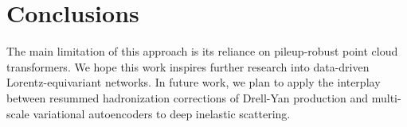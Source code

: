 \section{Conclusions}\label{sec:conclusions}

The main limitation of this approach is its reliance on pileup-robust
point cloud transformers. We hope this work inspires further research
into data-driven Lorentz-equivariant networks. In future work, we plan
to apply the interplay between resummed hadronization corrections of
Drell-Yan production and multi-scale variational autoencoders to deep
inelastic scattering.

